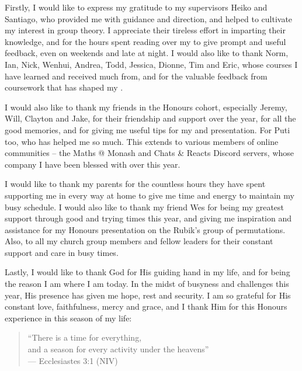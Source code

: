 Firstly, I would like to express my gratitude to my supervisors Heiko and Santiago, who provided me with guidance and direction, and helped to cultivate my interest in group theory. I appreciate their tireless effort in imparting their knowledge, and for the hours spent reading over my \thesis{} to give prompt and useful feedback, even on weekends and late at night. I would also like to thank Norm, Ian, Nick, Wenhui, Andrea, Todd, Jessica, Dionne, Tim and Eric, whose courses I have learned and received much from, and for the valuable feedback from coursework that has shaped my \thesis{}.

I would also like to thank my friends in the Honours cohort, especially Jeremy, Will, Clayton and Jake, for their friendship and support over the year, for all the good memories, and for giving me useful tips for my \thesis{} and presentation. For Puti too, who has helped me so much. This extends to various members of online communities -- the Maths @ Monash and Chats \& Reacts Discord servers, whose company I have been blessed with over this year.

I would like to thank my parents for the countless hours they have spent supporting me in every way at home to give me time and energy to maintain my busy schedule. I would also like to thank my friend Wes for being my greatest support through good and trying times this year, and giving me inspiration and assistance for my Honours presentation on the Rubik's group of permutations. Also, to all my church group members and fellow leaders for their constant support and care in busy times.

Lastly, I would like to thank God for His guiding hand in my life, and for being the reason I am where I am today. In the midst of busyness and challenges this year, His presence has given me hope, rest and security. I am so grateful for His constant love, faithfulness, mercy and grace, and I thank Him for this Honours experience in this season of my life:

\begin{quote}
    ``There is a time for everything, \\
    \hspace*{15pt} and a season for every activity under the heavens'' \\
    \null\hfill --- Ecclesiastes 3:1 (NIV)
\end{quote}